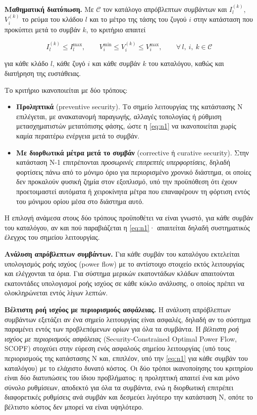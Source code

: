 \textbf{Μαθηματική διατύπωση.} Με $\mathcal{C}$ τον κατάλογο απρόβλεπτων συμβάντων και
$I_l^{(k)}$, $V_i^{(k)}$ το ρεύμα του κλάδου $l$ και το μέτρο της τάσης του ζυγού $i$ στην
κατάσταση που προκύπτει μετά το συμβάν $k$, το κριτήριο απαιτεί

\begin{equation}
I_l^{(k)} \le I_l^{\max}, \qquad V_i^{\min} \le V_i^{(k)} \le V_i^{\max},
\qquad \forall\, l,\ i,\ k \in \mathcal{C}
\label{eq:n1}
\end{equation}

για κάθε κλάδο $l$, κάθε ζυγό $i$ και κάθε συμβάν $k$ του καταλόγου, καθώς και διατήρηση της
ευστάθειας.

Το κριτήριο ικανοποιείται με δύο τρόπους:

\begin{itemize}
\item \textbf{Προληπτικά} (preventive security). Το σημείο λειτουργίας της κατάστασης N
      επιλέγεται, με ανακατανομή παραγωγής, αλλαγές τοπολογίας ή ρύθμιση μετασχηματιστών
      μετατόπισης φάσης, ώστε η \eqref{eq:n1} να ικανοποιείται χωρίς καμία περαιτέρω ενέργεια
      μετά το συμβάν. 
\item \textbf{Με διορθωτικά μέτρα μετά το συμβάν} (corrective ή curative security). Στην
      κατάσταση N-1 επιτρέπονται \emph{προσωρινές επιτρεπτές υπερφορτίσεις}, δηλαδή φορτίσεις
      πάνω από το μόνιμο όριο για περιορισμένο χρονικό διάστημα, οι οποίες δεν προκαλούν φυσική
      ζημία στον εξοπλισμό, υπό την προϋπόθεση ότι έχουν προετοιμαστεί αυτόματα ή χειροκίνητα
      μέτρα που επαναφέρουν τη φόρτιση εντός του μόνιμου ορίου μέσα στο διάστημα αυτό.
\end{itemize}

Η επιλογή ανάμεσα στους δύο τρόπους προϋποθέτει να είναι γνωστό, για κάθε συμβάν του
καταλόγου, αν και πού παραβιάζεται η \eqref{eq:n1}· απαιτείται δηλαδή συστηματικός έλεγχος του
σημείου λειτουργίας.

\textbf{Ανάλυση απρόβλεπτων συμβάντων.} Για κάθε
συμβάν του καταλόγου εκτελείται υπολογισμός ροής ισχύος (power flow) με το αντίστοιχο
στοιχείο εκτός λειτουργίας και ελέγχονται τα όρια. Για σύστημα μερικών εκατοντάδων κλάδων
απαιτούνται εκατοντάδες υπολογισμοί ροής ισχύος σε κάθε κύκλο ανάλυσης, ο οποίος πρέπει να
ολοκληρώνεται εντός λίγων λεπτών.


\textbf{Βέλτιστη ροή ισχύος με περιορισμούς ασφάλειας.} Η ανάλυση απρόβλεπτων συμβάντων εξετάζει
αν ένα σημείο λειτουργίας είναι ασφαλές, δηλαδή αν το σύστημα παραμένει εντός των προβλεπόμενων ορίων για όλα τα συμβάντα. Η \emph{βέλτιστη ροή ισχύος με περιορισμούς ασφάλειας} (Security-Constrained Optimal Power
Flow, SCOPF) στοχεύει στην εύρεση ενός ασφαλούς σημείου λειτουργίας (υπό τους περιορισμούς της κατάστασης N
και, επιπλέον, υπό την \eqref{eq:n1} για κάθε συμβάν του καταλόγου) με το ελάχιστο δυνατό κόστος. Οι δύο τρόποι ικανοποίησης
του κριτηρίου είναι δύο διατυπώσεις του ίδιου προβλήματος: η προληπτική απαιτεί ένα και μόνο
σύνολο ρυθμίσεων, αποδεκτό για όλα τα συμβάντα, ενώ η διορθωτική επιτρέπει διαφορετικές
ρυθμίσεις ανά συμβάν και δεσμεύει λιγότερο την κατάσταση N, οπότε το βέλτιστο κόστος δεν μπορεί
να είναι υψηλότερο. 


